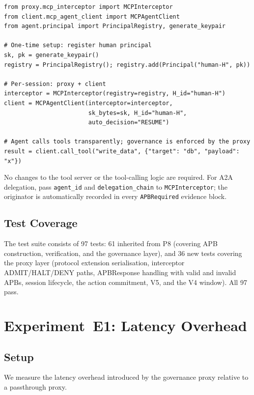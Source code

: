 \documentclass[11pt]{article}
\begin{document}
\begin{verbatim}
from proxy.mcp_interceptor import MCPInterceptor
from client.mcp_agent_client import MCPAgentClient
from agent.principal import PrincipalRegistry, generate_keypair

# One-time setup: register human principal
sk, pk = generate_keypair()
registry = PrincipalRegistry(); registry.add(Principal("human-H", pk))

# Per-session: proxy + client
interceptor = MCPInterceptor(registry=registry, H_id="human-H")
client = MCPAgentClient(interceptor=interceptor,
                        sk_bytes=sk, H_id="human-H",
                        auto_decision="RESUME")

# Agent calls tools transparently; governance is enforced by the proxy
result = client.call_tool("write_data", {"target": "db", "payload": "x"})
\end{verbatim}

\noindent
No changes to the tool server or the tool-calling logic are required.
For A2A delegation, pass \texttt{agent\_id} and \texttt{delegation\_chain}
to \texttt{MCPInterceptor}; the originator is automatically recorded
in every \texttt{APBRequired} evidence block.

\subsection{Test Coverage}

The test suite consists of 97 tests:
61 inherited from P8 (covering APB construction, verification, and
the governance layer), and 36 new tests covering the proxy layer
(protocol extension serialisation, interceptor ADMIT/HALT/DENY paths,
APBResponse handling with valid and invalid APBs, session lifecycle,
the action commitment, V5, and the V4 window).
All 97 pass.

\section{Experiment~E1: Latency Overhead}
\label{sec:exp1}

\subsection{Setup}

We measure the latency overhead introduced by the governance proxy
relative to a passthrough proxy.
\end{document}

